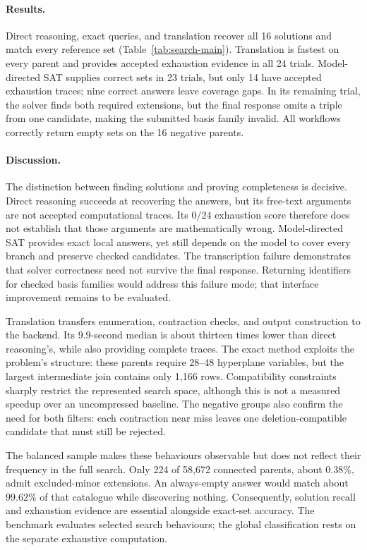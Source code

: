 \documentclass[11pt,letterpaper,titlepage]{article}
\begin{document}
\paragraph{Results.}
Direct reasoning, exact queries, and translation recover all 16 solutions and match every reference set (Table~\ref{tab:search-main}). Translation is fastest on every parent and provides accepted exhaustion evidence in all 24 trials. Model-directed SAT supplies correct sets in 23 trials, but only 14 have accepted exhaustion traces; nine correct answers leave coverage gaps. In its remaining trial, the solver finds both required extensions, but the final response omits a triple from one candidate, making the submitted basis family invalid. All workflows correctly return empty sets on the 16 negative parents.

\paragraph{Discussion.}
The distinction between finding solutions and proving completeness is decisive. Direct reasoning succeeds at recovering the answers, but its free-text arguments are not accepted computational traces. Its \(0/24\) exhaustion score therefore does not establish that those arguments are mathematically wrong. Model-directed SAT provides exact local answers, yet still depends on the model to cover every branch and preserve checked candidates. The transcription failure demonstrates that solver correctness need not survive the final response. Returning identifiers for checked basis families would address this failure mode; that interface improvement remains to be evaluated.

Translation transfers enumeration, contraction checks, and output construction to the backend. Its 9.9-second median is about thirteen times lower than direct reasoning's, while also providing complete traces. The exact method exploits the problem's structure: these parents require 28--48 hyperplane variables, but the largest intermediate join contains only 1,166 rows. Compatibility constraints sharply restrict the represented search space, although this is not a measured speedup over an uncompressed baseline. The negative groups also confirm the need for both filters: each contraction near miss leaves one deletion-compatible candidate that must still be rejected.

The balanced sample makes these behaviours observable but does not reflect their frequency in the full search. Only 224 of 58,672 connected parents, about \(0.38\%\), admit excluded-minor extensions. An always-empty answer would match about \(99.62\%\) of that catalogue while discovering nothing. Consequently, solution recall and exhaustion evidence are essential alongside exact-set accuracy. The benchmark evaluates selected search behaviours; the global classification rests on the separate exhaustive computation.
\end{document}
